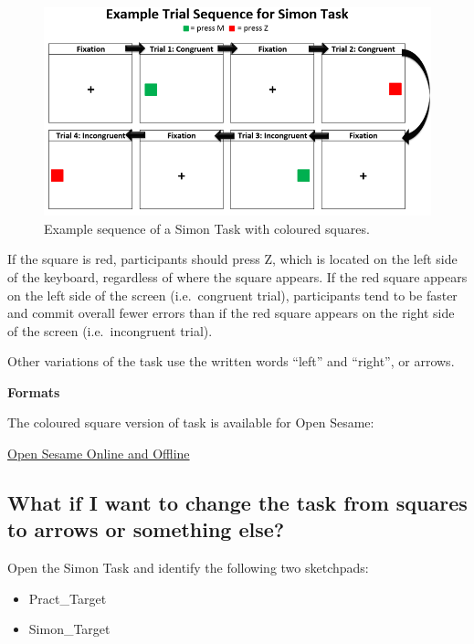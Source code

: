 \documentclass[
]{book}
\begin{document}
\begin{figure}

{\centering \includegraphics[width=0.8\linewidth]{images/SimonTaskExample} 

}

\caption{Example sequence of a Simon Task with coloured squares.}\label{fig:Figure3-4}
\end{figure}

If the square is red, participants should press Z, which is located on the left side of the keyboard, regardless of where the square appears. If the red square appears on the left side of the screen (i.e.~congruent trial), participants tend to be faster and commit overall fewer errors than if the red square appears on the right side of the screen (i.e.~incongruent trial).

Other variations of the task use the written words ``left'' and ``right'', or arrows.

\textbf{Formats}

The coloured square version of task is available for Open Sesame:

\href{link\%20here}{Open Sesame Online and Offline}

\hypertarget{what-if-i-want-to-change-the-task-from-squares-to-arrows-or-something-else}{%
\subsection{What if I want to change the task from squares to arrows or something else?}\label{what-if-i-want-to-change-the-task-from-squares-to-arrows-or-something-else}}

Open the Simon Task and identify the following two sketchpads:

\begin{itemize}
\item
  Pract\_Target
\item
  Simon\_Target
\end{itemize}
\end{document}

